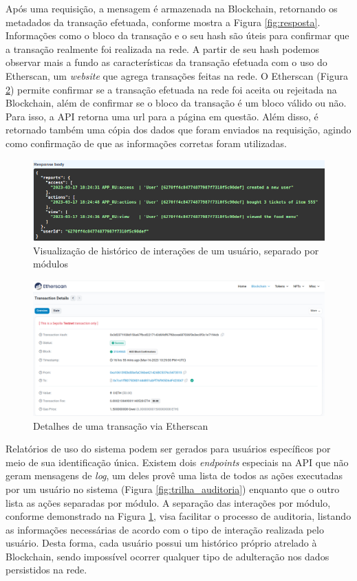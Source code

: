 Após uma requisição, a mensagem é armazenada na Blockchain, retornando os metadados da transação efetuada, conforme mostra a Figura \ref{fig:resposta}. Informações como o bloco da transação e o seu hash são úteis para confirmar que a transação realmente foi realizada na rede. A partir de seu hash podemos observar mais a fundo as características da transação efetuada com o uso do Etherscan, um \emph{website} que agrega transações feitas na rede. O Etherscan (Figura \ref{fig:etherscan}) permite confirmar se a transação efetuada na rede foi aceita ou rejeitada na Blockchain, além de confirmar se o bloco da transação é um bloco válido ou não. Para isso, a API retorna uma url para a página em questão. Além disso, é retornado também uma cópia dos dados que foram enviados na requisição, agindo como confirmação de que as informações corretas foram utilizadas.


\begin{figure}
    \centering
    \includegraphics[width=1\textwidth]{img/Cap4/relatorio modulos.png}
    \caption{Visualização de histórico de interações de um usuário, separado por módulos}
    \label{fig:relatorio_modulos}
\end{figure}

\begin{figure}
    \centering
    \includegraphics[width=1\textwidth]{img/Cap4/etherscan.png}
    \caption{Detalhes de uma transação via Etherscan}
    \label{fig:etherscan}
\end{figure}

Relatórios de uso do sistema podem ser gerados para usuários específicos por meio de sua identificação única. Existem dois \emph{endpoints} especiais na API que não geram mensagens de \emph{log}, um deles provê uma lista de todos as ações executadas por um usuário no sistema (Figura \ref{fig:trilha_auditoria}) enquanto que o outro lista as ações separadas por módulo. A separação das interações por módulo, conforme demonstrado na Figura \ref{fig:relatorio_modulos}, visa facilitar o processo de auditoria, listando as informações necessárias de acordo com o tipo de interação realizada pelo usuário. Desta forma, cada usuário possui um histórico próprio atrelado à Blockchain, sendo impossível ocorrer qualquer tipo de adulteração nos dados persistidos na rede.


